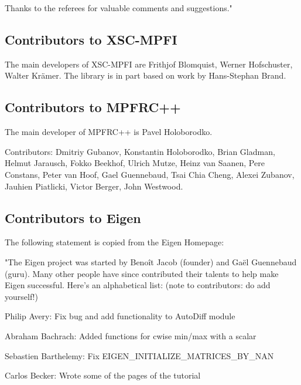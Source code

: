 \vpara
Thanks to the referees for valuable comments and suggestions."



\subsection{Contributors to XSC-MPFI}
\label{Contributors to XSC-MPFI}
The main developers of XSC-MPFI are Frithjof Blomquist, Werner Hofschuster, Walter Kr\"amer. 
The library is in part based on work by Hans-Stephan Brand.



\subsection{Contributors to MPFRC++}
\label{Contributors to MPFRC++}
The main developer of MPFRC++ is Pavel Holoborodko.

Contributors:
Dmitriy Gubanov, Konstantin Holoborodko, Brian Gladman, 
Helmut Jarausch, Fokko Beekhof, Ulrich Mutze, Heinz van Saanen, 
Pere Constans, Peter van Hoof, Gael Guennebaud, Tsai Chia Cheng, 
Alexei Zubanov, Jauhien Piatlicki, Victor Berger, John Westwood.


%
%


\subsection{Contributors to Eigen}
\label{Contributors to Eigen}

The following statement is copied from the Eigen Homepage:

\vpara
"The Eigen project was started by Beno\^{i}t Jacob  (founder) and Ga\"{e}l Guennebaud (guru). Many other people have since contributed their talents to help make Eigen successful. Here's an alphabetical list: (note to contributors: do add yourself!) 

\vpara
Philip Avery:  Fix bug and add functionality to AutoDiff module  

Abraham Bachrach:  Added functions for cwise min/max with a scalar  

Sebastien Barthelemy:  Fix EIGEN\_INITIALIZE\_MATRICES\_BY\_NAN  

Carlos Becker:  Wrote some of the pages of the tutorial  

